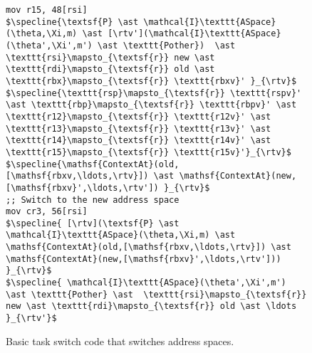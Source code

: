 \begin{figure}
\begin{lstlisting}[mathescape]
mov r15, 48[rsi]
$\specline{\textsf{P} \ast \mathcal{I}\texttt{ASpace}(\theta,\Xi,m) \ast [\rtv'](\mathcal{I}\texttt{ASpace}(\theta',\Xi',m') \ast \texttt{Pother})  \ast  \texttt{rsi}\mapsto_{\textsf{r}} new \ast \texttt{rdi}\mapsto_{\textsf{r}} old \ast \texttt{rbx}\mapsto_{\textsf{r}} \texttt{rbxv}' }_{\rtv}$
$\specline{\texttt{rsp}\mapsto_{\textsf{r}} \texttt{rspv}' \ast \texttt{rbp}\mapsto_{\textsf{r}} \texttt{rbpv}' \ast \texttt{r12}\mapsto_{\textsf{r}} \texttt{r12v}' \ast \texttt{r13}\mapsto_{\textsf{r}} \texttt{r13v}' \ast \texttt{r14}\mapsto_{\textsf{r}} \texttt{r14v}' \ast \texttt{r15}\mapsto_{\textsf{r}} \texttt{r15v}'}_{\rtv}$
$\specline{\mathsf{ContextAt}(old,[\mathsf{rbxv,\ldots,\rtv}]) \ast \mathsf{ContextAt}(new,[\mathsf{rbxv}',\ldots,\rtv']) }_{\rtv}$
;; Switch to the new address space
mov cr3, 56[rsi]
$\specline{ [\rtv](\textsf{P} \ast \mathcal{I}\texttt{ASpace}(\theta,\Xi,m) \ast \mathsf{ContextAt}(old,[\mathsf{rbxv,\ldots,\rtv}]) \ast \mathsf{ContextAt}(new,[\mathsf{rbxv}',\ldots,\rtv']))  }_{\rtv}$
$\specline{ \mathcal{I}\texttt{ASpace}(\theta',\Xi',m') \ast \texttt{Pother} \ast  \texttt{rsi}\mapsto_{\textsf{r}} new \ast \texttt{rdi}\mapsto_{\textsf{r}} old \ast \ldots }_{\rtv'}$
\end{lstlisting}
\vspace{-1em}
\caption{Basic task switch code that switches address spaces.}
\label{fig:swtch}
\end{figure}

